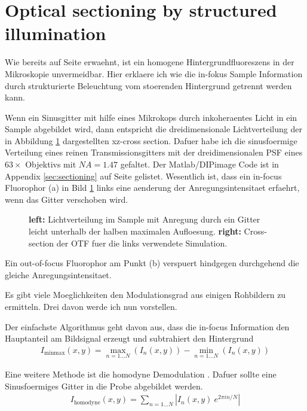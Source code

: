 \section{Optical sectioning by structured illumination}
\begin{summary}
  Wie bereits auf Seite \pageref{sec:sectioning-intro} erwaehnt, ist
  ein homogene Hintergrundfluoreszens in der Mikroskopie unvermeidbar.
  Hier erklaere ich wie die in-fokus Sample Information durch
  strukturierte Beleuchtung vom stoerenden Hintergrund getrennt werden
  kann.
\end{summary}

Wenn ein Sinusgitter mit hilfe eines Mikrokops durch inkoheraentes
Licht in ein Sample abgebildet wird, dann entspricht die
dreidimensionale Lichtverteilung der in Abbildung
\ref{fig:hilo-sec-Illum2} dargestellten xz-cross section. Dafuer habe
ich die sinusfoermige Verteilung eines reinen Transmissionsgitters mit
der dreidimensionalen PSF eines $63\times$ Objektivs mit $NA=1.47$
gefaltet. Der Matlab/DIPimage Code ist in Appendix
\ref{sec:sectioning} auf Seite \pageref{sec:sectioning} gelistet.
Wesentlich ist, dass ein in-focus Fluorophor (a) in Bild
\ref{fig:hilo-sec-Illum2} links eine aenderung der
Anregungsintensitaet erfaehrt, wenn das Gitter verschoben wird. 
\begin{figure}[htbp]
  \centering
  \caption{{\bf left:} Lichtverteilung im Sample mit Anregung durch
    ein Gitter leicht unterhalb der halben maximalen Aufloesung. {\bf
      right:} Cross-section der OTF fuer die links verwendete
    Simulation.}
  \label{fig:hilo-sec-Illum2}
\end{figure}

Ein out-of-focus Fluorophor am Punkt (b) verspuert hindgegen
durchgehend die gleiche Anregungsintensitaet. 

Es gibt viele Moeglichkeiten den Modulationsgrad aus einigen
Rohbildern zu ermitteln. Drei davon werde ich nun vorstellen.

Der einfachste Algorithmus \citep{Benedetti1997} geht davon aus, dass
die in-focus Information den Hauptanteil am Bildsignal erzeugt und
subtrahiert den Hintergrund
\begin{align}
  I_\textrm{minmax}(x,y) = \max_{n=1\ldots N}(I_n(x,y))- \min_{n=1\ldots N}(I_n(x,y))
\end{align}

Eine weitere Methode ist die homodyne Demodulation
\citep{Neil1997}. Dafuer sollte eine Sinusfoermiges Gitter in die Probe abgebildet werden.
\begin{align}
  I_\textrm{homodyne}(x,y) = \sum_{n=1\ldots N}\left| I_n(x,y)\ e^{2\pi i n/N}\right|
\end{align}

